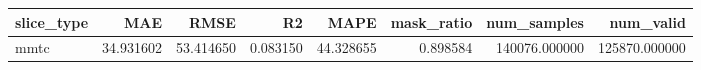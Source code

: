 \begin{tabular}{lrrrrrrr}
\toprule
slice_type & MAE & RMSE & R2 & MAPE & mask_ratio & num_samples & num_valid \\
\midrule
mmtc & 34.931602 & 53.414650 & 0.083150 & 44.328655 & 0.898584 & 140076.000000 & 125870.000000 \\
\bottomrule
\end{tabular}
